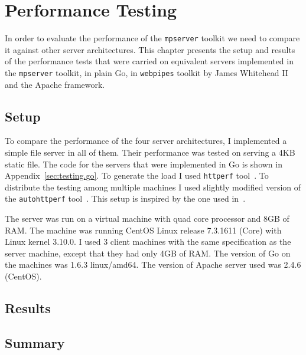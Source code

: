 \section{Performance Testing}
\label{sec:test}
In order to evaluate the performance of the \texttt{mpserver} toolkit we 
need to compare it against other server architectures.
This chapter presents the setup and results of the performance tests
that were carried on equivalent servers implemented in the \texttt{mpserver} toolkit,
in plain Go, in \texttt{webpipes} toolkit by James Whitehead II~\cite{whitehead} 
and the Apache framework.

\subsection{Setup}
To compare the performance of the four server architectures, I 
implemented a simple file server in all of them. Their performance 
was tested on serving a 4KB static file. The code for the servers 
that were implemented in Go is shown in Appendix~\ref{sec:testing.go}. To generate 
the load I used \texttt{httperf} tool~\cite{httperf}. To distribute 
the testing among multiple machines I used slightly modified version
of the \texttt{autohttperf} tool~\cite{whitehead}.
This setup is inspired by the one used in~\cite{whitehead}.

The server was run on a virtual machine with quad core processor and 
8GB of RAM. The machine was running CentOS Linux release 7.3.1611 (Core)
with Linux kernel 3.10.0.
I used 3 client machines with the same specification as the server machine, 
except that they had only 4GB of RAM. The version of Go on the machines was
1.6.3 linux/amd64. The version of Apache server used was 2.4.6 (CentOS).

\subsection{Results}

\subsection{Summary}

